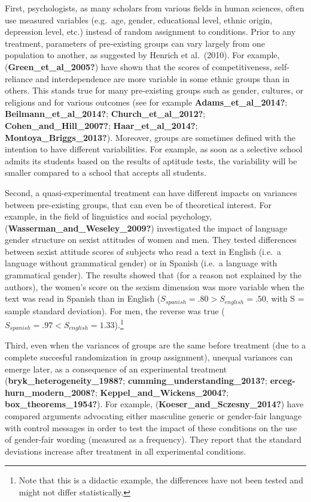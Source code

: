 \documentclass[
  english,
  man]{apa6}
\begin{document}
First, psychologists, as many scholars from various fields in human sciences, often use measured variables (e.g.~age, gender, educational level, ethnic origin, depression level, etc.) instead of random assignment to conditions. Prior to any treatment, parameters of pre-existing groups can vary largely from one population to another, as suggested by Henrich et al.~(2010). For example, (\textbf{Green\_et\_al\_2005?}) have shown that the scores of competitiveness, self-reliance and interdependence are more variable in some ethnic groups than in others. This stands true for many pre-existing groups such as gender, cultures, or religions and for various outcomes (see for example \textbf{Adams\_et\_al\_2014?}; \textbf{Beilmann\_et\_al\_2014?}; \textbf{Church\_et\_al\_2012?}; \textbf{Cohen\_and\_Hill\_2007?}; \textbf{Haar\_et\_al\_2014?}; \textbf{Montoya\_Briggs\_2013?}). Moreover, groups are sometimes defined with the intention to have different variabilities. For example, as soon as a selective school admits its students based on the results of aptitude tests, the variability will be smaller compared to a school that accepts all students.

Second, a quasi-experimental treatment can have different impacts on variances between pre-existing groups, that can even be of theoretical interest. For example, in the field of linguistics and social psychology, (\textbf{Wasserman\_and\_Weseley\_2009?}) investigated the impact of language gender structure on sexist attitudes of women and men. They tested differences between sexist attitude scores of subjects who read a text in English (i.e.~a language without grammatical gender) or in Spanish (i.e.~a language with grammatical gender). The results showed that (for a reason not explained by the authors), the women's score on the sexism dimension was more variable when the text was read in Spanish than in English (\(S_{spanish}=.80 > S_{english}=.50\), with S = sample standard deviation). For men, the reverse was true (\(S_{spanish}=.97 < S_{english}=1.33\)).\footnote{Note that this is a didactic example, the differences have not been tested and might not differ statistically.}

Third, even when the variances of groups are the same before treatment (due to a complete succesful randomization in group assignment), unequal variances can emerge later, as a consequence of an experimental treatment (\textbf{bryk\_heterogeneity\_1988?}; \textbf{cumming\_understanding\_2013?}; \textbf{erceg-hurn\_modern\_2008?}; \textbf{Keppel\_and\_Wickens\_2004?}; \textbf{box\_theorems\_1954?}). For example, (\textbf{Koeser\_and\_Sczesny\_2014?}) have compared arguments advocating either masculine generic or gender-fair language with control messages in order to test the impact of these conditions on the use of gender-fair wording (measured as a frequency). They report that the standard deviations increase after treatment in all experimental conditions.
\end{document}
